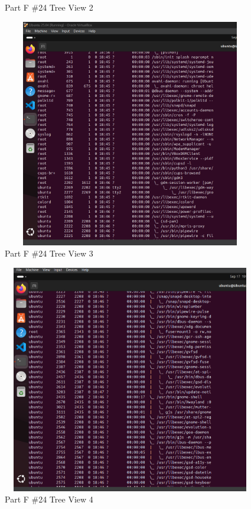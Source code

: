 \begin{itemize}
\begin{figure}[H]
        \caption{Part F \#24 Tree View 2}
        \label{fig:partF 24 Tree 2}
    \end{figure}
    \begin{figure}[H]
        \centering
        \includegraphics[width=15cm, height=10cm]{png/LinuxProblemSetPicsPNG/TreeView3.png}
        \caption{Part F \#24 Tree View 3}
        \label{fig:partF 24 Tree 3}
    \end{figure}
    \begin{figure}[H]
        \centering
        \includegraphics[width=15cm, height=10cm]{png/LinuxProblemSetPicsPNG/TreeView4.png}
        \caption{Part F \#24 Tree View 4}
        \label{fig:partF 24 Tree 4}
    \end{figure}

\end{itemize}
